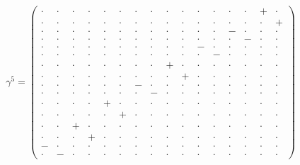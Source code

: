 \documentclass[
  10pt,
]{article}
\begin{document}
\[\gamma^5=\left(\begin{smallmatrix} \cdot & \cdot & \cdot & \cdot & \cdot & \cdot & \cdot & \cdot & \cdot & \cdot & \cdot & \cdot & \cdot & \cdot & + & \cdot \\ \cdot & \cdot & \cdot & \cdot & \cdot & \cdot & \cdot & \cdot & \cdot & \cdot & \cdot & \cdot & \cdot & \cdot & \cdot & + \\ \cdot & \cdot & \cdot & \cdot & \cdot & \cdot & \cdot & \cdot & \cdot & \cdot & \cdot & \cdot & - & \cdot & \cdot & \cdot \\ \cdot & \cdot & \cdot & \cdot & \cdot & \cdot & \cdot & \cdot & \cdot & \cdot & \cdot & \cdot & \cdot & - & \cdot & \cdot \\ \cdot & \cdot & \cdot & \cdot & \cdot & \cdot & \cdot & \cdot & \cdot & \cdot & - & \cdot & \cdot & \cdot & \cdot & \cdot \\ \cdot & \cdot & \cdot & \cdot & \cdot & \cdot & \cdot & \cdot & \cdot & \cdot & \cdot & - & \cdot & \cdot & \cdot & \cdot \\ \cdot & \cdot & \cdot & \cdot & \cdot & \cdot & \cdot & \cdot & + & \cdot & \cdot & \cdot & \cdot & \cdot & \cdot & \cdot \\ \cdot & \cdot & \cdot & \cdot & \cdot & \cdot & \cdot & \cdot & \cdot & + & \cdot & \cdot & \cdot & \cdot & \cdot & \cdot \\ \cdot & \cdot & \cdot & \cdot & \cdot & \cdot & - & \cdot & \cdot & \cdot & \cdot & \cdot & \cdot & \cdot & \cdot & \cdot \\ \cdot & \cdot & \cdot & \cdot & \cdot & \cdot & \cdot & - & \cdot & \cdot & \cdot & \cdot & \cdot & \cdot & \cdot & \cdot \\ \cdot & \cdot & \cdot & \cdot & + & \cdot & \cdot & \cdot & \cdot & \cdot & \cdot & \cdot & \cdot & \cdot & \cdot & \cdot \\ \cdot & \cdot & \cdot & \cdot & \cdot & + & \cdot & \cdot & \cdot & \cdot & \cdot & \cdot & \cdot & \cdot & \cdot & \cdot \\ \cdot & \cdot & + & \cdot & \cdot & \cdot & \cdot & \cdot & \cdot & \cdot & \cdot & \cdot & \cdot & \cdot & \cdot & \cdot \\ \cdot & \cdot & \cdot & + & \cdot & \cdot & \cdot & \cdot & \cdot & \cdot & \cdot & \cdot & \cdot & \cdot & \cdot & \cdot \\ - & \cdot & \cdot & \cdot & \cdot & \cdot & \cdot & \cdot & \cdot & \cdot & \cdot & \cdot & \cdot & \cdot & \cdot & \cdot \\ \cdot & - & \cdot & \cdot & \cdot & \cdot & \cdot & \cdot & \cdot & \cdot & \cdot & \cdot & \cdot & \cdot & \cdot & \cdot \end{smallmatrix}\right)\]
\end{document}
